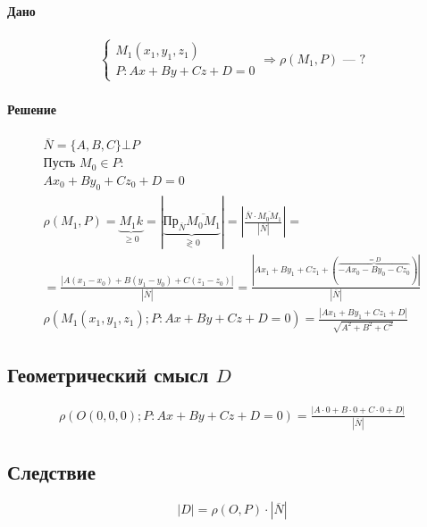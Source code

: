 \documentclass{article}
\begin{document}
\paragraph{Дано}
\begin{gather*}
    \begin{cases}
        M_1(x_1, y_1, z_1) \\
        P: Ax + By + Cz + D = 0
    \end{cases} \Rightarrow
    \rho(M_1, P) \text{ --- ?}
\end{gather*}
\paragraph{Решение}
\begin{gather*}
    \overline{N} = \{A, B, C\} \bot P \\
    \text{Пусть } M_0 \in P: \\
    Ax_0 + By_0 + Cz_0 + D = 0 \\
    \rho(M_1, P) = \underbrace{M_1 k}_{\ge 0} = 
    \left| \underbrace{\text{Пр}_{\overline{N}} \overline{M_0 M_1}}_{\gtrless 0} \right| = 
    \left| \frac{\overline{N} \cdot \overline{M_0 M_1}}{\left| \overline{N} \right|} \right| = \\
    = \frac{\left| A(x_1 - x_0) + B(y_1 - y_0) + C(z_1 - z_0) \right|}{\left| \overline{N} \right|} =
    \frac{\left| Ax_1 + By_1 + Cz_1 + (\overbrace{-Ax_0 - By_0 - Cz_0}^{= D}) \right|}{\left| \overline{N} \right|} \\
    \rho(M_1(x_1, y_1, z_1); P: Ax + By + Cz + D = 0) = 
    \frac{\left| Ax_1 + By_1 + Cz_1 + D \right|}{\sqrt{A^2 + B^2 + C^2}}
\end{gather*}


\subsection{Геометрический смысл $D$}
\begin{gather*}
    \rho(O(0, 0, 0); P: Ax + By + Cz + D = 0) = 
    \frac{\left| A \cdot 0 + B \cdot 0 + C \cdot 0 + D \right|}{\left| \overline{N} \right|}
\end{gather*}


\subsection{Следствие}
\[
    \left| D \right| = \rho(O, P) \cdot \left| \overline{N} \right|
\]
\end{document}
